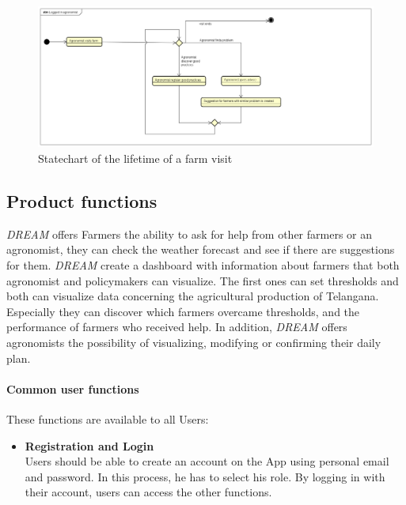 \bigskip
\begin{figure}[H]
    \includegraphics[width=\textwidth,height=\textheight,keepaspectratio]{Images/agronomistVisitFarm.png}
    \caption{Statechart of the lifetime of a farm visit}
    \label{fig:statechart_agronomist_visit}
\end{figure}

\newpage
\subsection{Product functions}
\emph{DREAM} offers Farmers the ability to ask for help from other farmers or an agronomist, 
they can check the weather forecast and see if there are suggestions for them. 
\emph{DREAM} create a dashboard with information about farmers that both agronomist and policymakers can
visualize. The first ones can set thresholds and both can visualize data concerning the agricultural production of Telangana.
Especially they can discover which farmers overcame thresholds, and the performance of farmers who received help.
In addition, \emph{DREAM} offers agronomists the possibility of visualizing, modifying or confirming their daily plan.

\paragraph{Common user functions} These functions are available to all Users:
\begin{itemize}
    \item \textbf{Registration and Login}\\
          Users should be able to create an account on the App using personal email and password.
          In this process, he has to select his role.
          \newline By logging in with their account, users can access the other functions.
\end{itemize}

